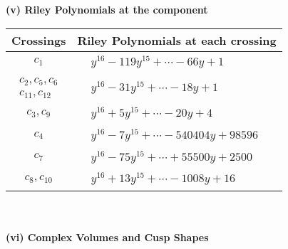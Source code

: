 \documentclass[1p]{elsarticle_modified}
\theoremstyle{definition}
\begin{document}
\newpage\renewcommand{\arraystretch}{1}
\flushleft \textbf{(v) Riley Polynomials at the component}\newline \\
\begin{tabular}{m{50pt}|m{274pt}}
Crossings & \hspace{64pt}Riley Polynomials at each crossing \\
\hline $$\begin{aligned}c_{1}\end{aligned}$$&$\begin{aligned}
&y^{16}-119 y^{15}+\cdots-66 y+1
\end{aligned}$\\
\hline $$\begin{aligned}c_{2},c_{5},c_{6}\\c_{11},c_{12}\end{aligned}$$&$\begin{aligned}
&y^{16}-31 y^{15}+\cdots-18 y+1
\end{aligned}$\\
\hline $$\begin{aligned}c_{3},c_{9}\end{aligned}$$&$\begin{aligned}
&y^{16}+5 y^{15}+\cdots-20 y+4
\end{aligned}$\\
\hline $$\begin{aligned}c_{4}\end{aligned}$$&$\begin{aligned}
&y^{16}-7 y^{15}+\cdots-540404 y+98596
\end{aligned}$\\
\hline $$\begin{aligned}c_{7}\end{aligned}$$&$\begin{aligned}
&y^{16}-75 y^{15}+\cdots+55500 y+2500
\end{aligned}$\\
\hline $$\begin{aligned}c_{8},c_{10}\end{aligned}$$&$\begin{aligned}
&y^{16}+13 y^{15}+\cdots-1008 y+16
\end{aligned}$\\
\hline
\end{tabular}\\~\\
\newpage\flushleft \textbf{(vi) Complex Volumes and Cusp Shapes}
\end{document}
